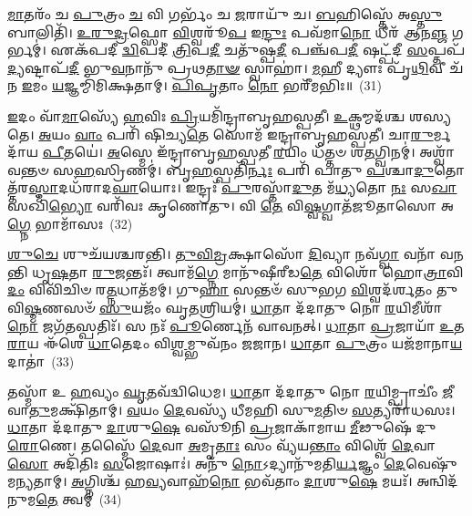 \-\ul{𑌮𑌾}\-𑌤𑌰𑌂᳴ 𑌚 \ul{𑌪𑍁}\-𑌤𑍍𑌰𑌂 \ul{𑌚} 𑌵𑌿 𑌗𑌰𑍍𑌭𑌂᳴ 𑌚 \ul{𑌜}\-𑌰𑌾𑌯𑍁᳴ 𑌚। \ul{𑌬}\-𑌹𑌿𑌸𑍍𑌤𑍇᳴ 𑌅\-\ul{𑌸𑍍𑌤𑍁} 𑌬𑌾𑌲𑌿𑌤𑌿᳴। \ul{𑌉}\-\-\ul{𑌰𑍁}\-\-\ul{𑌦𑍍𑌰}\-𑌫𑍍𑌸𑍋 \ul{𑌵𑌿}\-𑌶𑍍𑌵𑌰𑍂᳴\-\ul{𑌪} 𑌇\-\ul{𑌨𑍍𑌦𑍁𑌃} 𑌪𑌵᳴𑌮𑌾\-\ul{𑌨𑍋} 𑌧𑍀𑌰᳴ 𑌆𑌨\-\ul{𑌞𑍍𑌜} 𑌗𑌰𑍍𑌭𑌮𑍍॑। 𑌏𑌕᳴𑌪𑌦𑍀 \ul{𑌦𑍍𑌵𑌿}\-𑌪𑌦𑍀॑ \ul{𑌤𑍍𑌰𑌿}\-𑌪\-\ul{𑌦𑍀} 𑌚𑌤𑍁᳴𑌷𑍍𑌪\-\ul{𑌦𑍀} 𑌪𑌞𑍍𑌚᳴𑌪\-\ul{𑌦𑍀} 𑌷𑌟𑍍𑌪᳴𑌦𑍀 \ul{𑌸}\-𑌪𑍍𑌤𑌪᳴\-\ul{𑌦𑍍𑌯}\-𑌷𑍍𑌟𑌾𑌪᳴\-\ul{𑌦𑍀} 𑌭𑍁\-\ul{𑌵}\-𑌨𑌾𑌨𑍁᳴ 𑌪𑍍𑌰𑌥\-\ul{𑌤𑌾}\-\-\ul{𑍟} 𑌸𑍍𑌵𑌾𑌹𑌾॑। \ul{𑌮}\-𑌹𑍀 𑌦𑍍𑌯𑍗𑌃 𑌪𑍃᳴\-\ul{𑌥𑌿}\-𑌵𑍀 𑌚᳴ 𑌨 \ul{𑌇}\-𑌮𑌂 \ul{𑌯}\-𑌜𑍍𑌞𑌮𑍍𑌮𑌿᳴𑌮𑌿𑌕𑍍𑌷𑌤𑌾𑌮𑍍। \ul{𑌪𑌿}\-\-\ul{𑌪𑍃}\-𑌤𑌾𑌂 \ul{𑌨𑍋} 𑌭𑌰𑍀᳴𑌮𑌭𑌿𑌃॥~(31)

{\anuvakamend[{\-\ul{𑌗}\-\-\ul{𑌵𑍀}\-𑌨𑍍𑌯𑍗᳴ 𑌵𑌿 𑌚𑌤𑍁᳴𑌶𑍍𑌚𑌤𑍍𑌵𑌾𑌰𑌿𑍞𑌶𑌚𑍍𑌚}]}%

\-\ul{𑌇}\-𑌦𑌂 𑌵𑌾᳴\-\ul{𑌮𑌾}\-𑌸𑍍𑌯𑍇᳴ \ul{𑌹}\-𑌵𑌿𑌃 \ul{𑌪𑍍𑌰𑌿}\-𑌯𑌮𑌿᳴𑌨𑍍𑌦𑍍𑌰𑌾𑌬𑍃𑌹𑌸𑍍𑌪𑌤𑍀। \ul{𑌉}\-𑌕𑍍𑌥𑌮𑍍𑌮𑌦᳴𑌶𑍍𑌚 𑌶𑌸𑍍𑌯𑌤𑍇। \ul{𑌅}\-𑌯𑌂 \ul{𑌵𑌾𑌂} 𑌪𑌰𑌿᳴ 𑌷𑌿𑌚𑍍𑌯\-\ul{𑌤𑍇} 𑌸𑍋𑌮᳴ 𑌇𑌨𑍍𑌦𑍍𑌰𑌾𑌬𑍃𑌹𑌸𑍍𑌪𑌤𑍀। 𑌚𑌾\-\ul{𑌰𑍁}\-𑌰𑍍𑌮𑌦𑌾᳴𑌯 \ul{𑌪𑍀}\-𑌤𑌯𑍇॑। \ul{𑌅}\-𑌸𑍍𑌮𑍇 𑌇᳴𑌨𑍍𑌦𑍍𑌰𑌾𑌬𑍃𑌹𑌸𑍍𑌪𑌤𑍀 \ul{𑌰}\-𑌯𑌿𑌂 𑌧᳴𑌤𑍍𑌤𑍞 𑌶\-\ul{𑌤}\-𑌗𑍍𑌵𑌿𑌨𑌮𑍍॑। 𑌅𑌶𑍍𑌵𑌾᳴𑌵𑌨𑍍𑌤𑍞 𑌸\-\ul{𑌹}\-𑌸𑍍𑌰𑌿𑌣𑌮𑍍॑। 𑌬𑍃\-\ul{𑌹}\-𑌸𑍍𑌪𑌤𑌿᳴\-\ul{𑌰𑍍𑌨𑌃} 𑌪𑌰𑌿᳴ 𑌪𑌾𑌤𑍁 \ul{𑌪}\-𑌶𑍍𑌚𑌾\-\ul{𑌦𑍁}\-𑌤𑍋𑌤𑍍𑌤᳴𑌰\-\ul{𑌸𑍍𑌮𑌾}\-𑌦𑌧᳴𑌰𑌾𑌦\-\ul{𑌘𑌾}\-𑌯𑍋𑌃। 𑌇𑌨𑍍𑌦𑍍𑌰𑌃᳴ \ul{𑌪𑍁}\-𑌰𑌸𑍍𑌤𑌾᳴\-\ul{𑌦𑍁}\-𑌤 𑌮᳴\-\ul{𑌧𑍍𑌯}\-𑌤𑍋 \ul{𑌨𑌃} 𑌸\-\ul{𑌖𑌾} 𑌸𑌖𑌿᳴\-\ul{𑌭𑍍𑌯𑍋} 𑌵𑌰𑌿᳴𑌵𑌃 𑌕𑍃𑌣𑍋𑌤𑍁। 𑌵𑌿 \ul{𑌤𑍇} 𑌵𑌿\-\ul{𑌷𑍍𑌵}\-𑌗𑍍𑌵𑌾𑌤᳴𑌜𑍂𑌤𑌾𑌸𑍋 𑌅\-\ul{𑌗𑍍𑌨𑍇} 𑌭𑌾𑌮𑌾᳴𑌸𑌃~(32)

\-\ul{𑌶𑍁}\-\-\ul{𑌚𑍇} 𑌶𑍁𑌚᳴𑌯𑌶𑍍𑌚𑌰𑌨𑍍𑌤𑌿। \ul{𑌤𑍁}\-\-\ul{𑌵𑌿}\-\-\ul{𑌮𑍍𑌰}\-𑌕𑍍𑌷𑌾𑌸𑍋᳴ \ul{𑌦𑌿}\-𑌵𑍍𑌯𑌾 𑌨𑌵᳴\-\ul{𑌗𑍍𑌵𑌾} 𑌵𑌨𑌾᳴ 𑌵𑌨𑌨𑍍𑌤𑌿 𑌧𑍃\-\ul{𑌷}\-𑌤𑌾 \ul{𑌰𑍁}\-𑌜𑌨𑍍𑌤𑌃᳴। 𑌤𑍍𑌵𑌾𑌮᳴\-\ul{𑌗𑍍𑌨𑍇} 𑌮𑌾𑌨𑍁᳴𑌷𑍀𑌰𑍀𑌡\-\ul{𑌤𑍇} 𑌵𑌿𑌶𑍋᳴ 𑌹𑍋\-\ul{𑌤𑍍𑌰𑌾}\-𑌵𑌿\-\ul{𑌦𑌂} 𑌵𑌿𑌵𑌿᳴𑌚𑌿𑍞 𑌰\-\ul{𑌤𑍍𑌨}\-𑌧𑌾𑌤᳴𑌮𑌮𑍍। 𑌗𑍁\-\ul{𑌹𑌾} 𑌸𑌨𑍍𑌤𑍞᳴ 𑌸𑍁𑌭𑌗 \ul{𑌵𑌿}\-𑌶𑍍𑌵𑌦᳴𑌰𑍍𑌶𑌤𑌂 𑌤𑍁𑌵𑌿\-\ul{𑌷𑍍𑌮}\-𑌣𑌸𑍞᳴ \ul{𑌸𑍁}\-𑌯𑌜𑌂᳴ 𑌘𑍃\-\ul{𑌤}\-𑌶𑍍𑌰𑌿𑌯𑌮𑍍॑। \ul{𑌧𑌾}\-𑌤𑌾 𑌦᳴𑌦𑌾𑌤𑍁 𑌨𑍋 \ul{𑌰}\-𑌯𑌿𑌮𑍀𑌶𑌾᳴\-\ul{𑌨𑍋} 𑌜𑌗᳴\-\ul{𑌤}\-𑌸𑍍𑌪𑌤𑌿𑌃᳴। 𑌸 𑌨𑌃᳴ \ul{𑌪𑍂}\-𑌰𑍍𑌣𑍇𑌨᳴ 𑌵𑌾𑌵𑌨𑌤𑍍। \ul{𑌧𑌾}\-𑌤𑌾 \ul{𑌪𑍍𑌰}\-𑌜𑌾𑌯𑌾᳴ \ul{𑌉}\-𑌤 \ul{𑌰𑌾}\-𑌯 𑌈᳴𑌶𑍇 \ul{𑌧𑌾}\-𑌤𑍇𑌦𑌂 𑌵𑌿\-\ul{𑌶𑍍𑌵}\-𑌮𑍍𑌭𑍁𑌵᳴𑌨𑌂 𑌜𑌜𑌾𑌨। \ul{𑌧𑌾}\-𑌤𑌾 \ul{𑌪𑍁}\-𑌤𑍍𑌰𑌂 𑌯𑌜᳴𑌮𑌾𑌨𑌾\-\ul{𑌯} 𑌦𑌾𑌤𑌾॑~(33)

𑌤𑌸𑍍𑌮𑌾᳴ 𑌉 \ul{𑌹}\-𑌵𑍍𑌯𑌂 \ul{𑌘𑍃}\-𑌤𑌵᳴𑌦𑍍𑌵𑌿𑌧𑍇𑌮। \ul{𑌧𑌾}\-𑌤𑌾 𑌦᳴𑌦𑌾𑌤𑍁 𑌨𑍋 \ul{𑌰}\-𑌯𑌿𑌮𑍍𑌪𑍍𑌰𑌾𑌚𑍀𑌂॑ \ul{𑌜𑍀}\-𑌵𑌾\-\ul{𑌤𑍁}\-𑌮𑌕𑍍𑌷𑌿᳴𑌤𑌾𑌮𑍍। \ul{𑌵}\-𑌯𑌂 \ul{𑌦𑍇}\-𑌵𑌸𑍍𑌯᳴ 𑌧𑍀𑌮𑌹𑌿 𑌸𑍁\-\ul{𑌮}\-𑌤𑌿𑍞 \ul{𑌸}\-𑌤𑍍𑌯𑌰𑌾᳴𑌧𑌸𑌃। \ul{𑌧𑌾}\-𑌤𑌾 𑌦᳴𑌦𑌾𑌤𑍁 \ul{𑌦𑌾}\-𑌶𑍁\-\ul{𑌷𑍇} 𑌵𑌸𑍂᳴𑌨𑌿 \ul{𑌪𑍍𑌰}\-𑌜𑌾𑌕𑌾᳴𑌮𑌾𑌯 \ul{𑌮𑍀}\-𑌢𑍁𑌷𑍇᳴ 𑌦𑍁\-\ul{𑌰𑍋}\-𑌣𑍇। 𑌤𑌸𑍍𑌮𑍈᳴ \ul{𑌦𑍇}\-𑌵𑌾 \ul{𑌅}\-𑌮𑍃\-\ul{𑌤𑌾𑌃} 𑌸𑌂 𑌵𑍍𑌯᳴𑌯\-\ul{𑌨𑍍𑌤𑌾𑌂} 𑌵𑌿𑌶𑍍𑌵𑍇᳴ \ul{𑌦𑍇}\-𑌵𑌾\-\ul{𑌸𑍋} 𑌅𑌦𑌿᳴𑌤𑌿𑌃 \ul{𑌸}\-𑌜𑍋𑌷𑌾𑌃॑। 𑌅𑌨𑍁᳴ \ul{𑌨𑍋}\-\-𑌽𑌦𑍍𑌯𑌾𑌨𑍁᳴𑌮𑌤𑌿\-\ul{𑌰𑍍𑌯}\-𑌜𑍍𑌞𑌂 \ul{𑌦𑍇}\-𑌵𑍇𑌷𑍁᳴ 𑌮𑌨𑍍𑌯𑌤𑌾𑌮𑍍। \ul{𑌅}\-𑌗𑍍𑌨𑌿𑌶𑍍𑌚᳴ 𑌹\-\ul{𑌵𑍍𑌯}\-𑌵𑌾𑌹᳴\-\ul{𑌨𑍋} 𑌭𑌵᳴𑌤𑌾𑌂 \ul{𑌦𑌾}\-𑌶𑍁\-\ul{𑌷𑍇} 𑌮𑌯𑌃᳴। 𑌅𑌨𑍍𑌵𑌿𑌦᳴𑌨𑍁𑌮\-\ul{𑌤𑍇} 𑌤𑍍𑌵𑌮𑍍~(34)

